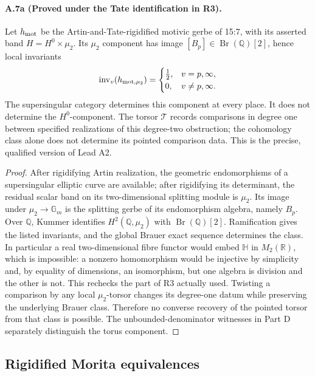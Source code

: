 \paragraph{A.7a (Proved under the Tate identification in R3).}
Let $h_{\rm mot}$ be the Artin-and-Tate-rigidified motivic gerbe of
15:7, with its asserted band $H=H^0\times\mu_2$. Its $\mu_2$
component has image $[B_p]\in\operatorname{Br}(\mathbb Q)[2]$, hence
local invariants
\[
 \operatorname{inv}_v(h_{\rm mot,\mu_2})=
 \begin{cases}\tfrac12,&v=p,\infty,\\0,&v\ne p,\infty.\end{cases}
\]
The supersingular category determines this component at every place.
It does not determine the $H^0$-component. The torsor $\mathcal T$
records comparisons in degree one between specified realizations
of this degree-two obstruction; the cohomology class alone does not
determine its pointed comparison data. This is the precise, qualified
version of Lead A2.

\begin{proof}
After rigidifying Artin realization, the geometric endomorphisms of
a supersingular elliptic curve are available; after rigidifying its
determinant, the residual scalar band on its two-dimensional splitting
module is $\mu_2$. Its image under $\mu_2\to\mathbb G_m$ is the
splitting gerbe of its endomorphism algebra, namely $B_p$.
Over $\mathbb Q$, Kummer identifies $H^2(\mathbb Q,\mu_2)$ with
$\operatorname{Br}(\mathbb Q)[2]$. Ramification gives the listed
invariants, and the global Brauer exact sequence determines the
class. In particular a real two-dimensional fibre functor would embed
$\mathbb H$ in $M_2(\mathbb R)$, which is impossible: a nonzero
homomorphism would be injective by simplicity and, by equality of
dimensions, an isomorphism, but one algebra is division and the other
is not. This rechecks the part of R3 actually used.
Twisting a comparison by any local $\mu_2$-torsor changes its
degree-one datum while preserving the underlying Brauer class.
Therefore no converse recovery of the pointed torsor from that
class is possible. The unbounded-denominator witnesses in Part D
separately distinguish the torus component.
\end{proof}

\subsection{Rigidified Morita equivalences}

